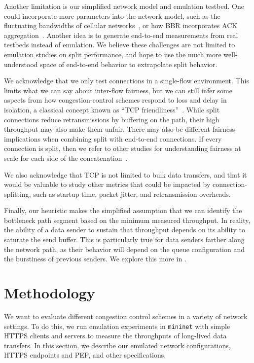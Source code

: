 Another limitation is our simplified network model and emulation testbed.
One could incorporate more parameters into the network model, such as the
fluctuating bandwidths of cellular networks~\cite{hayes2019mmwave}, or how BBR
incorporates ACK aggregation~\cite{cardwell2018bbr-ietf101}. Another idea is to
generate end-to-end measurements from real testbeds instead of emulation. We
believe these challenges are not limited to emulation studies on split
performance, and hope to use the much more well-understood space of end-to-end
behavior to extrapolate split behavior.

We acknowledge that we only test connections in a single-flow environment.
This limits what we can say about inter-flow fairness, but we can still infer
some aspects from how congestion-control schemes respond to loss and delay in
isolation, a classical concept known as ``TCP friendliness''~\cite{rfc5348}.
While split connections reduce retransmissions by buffering on the path,
their high throughput may also make them unfair. There may also be different
fairness implications when combining split with end-to-end connections.
If every connection is split, then we refer to other studies for understanding
fairness at scale for each side of the concatenation~\cite
{philip2021revisiting}.

We also acknowledge that TCP is not limited to bulk data transfers, and that
it would be valuable to study other metrics that could be impacted by
connection-splitting, such as startup time, packet jitter, and retransmission
overheads.

Finally, our heuristic makes the simplified assumption that we can identify the
bottleneck path segment based on the minimum measured throughput. In reality,
the ability of a data sender to sustain that throughput depends on its ability
to saturate the send buffer. This is particularly true for data senders farther
along the network path, as their behavior will depend on the queue
configuration and the burstiness of previous senders. We explore this more
in .

\section{Methodology}
\label{sec:splitting:methodology}




We want to evaluate different congestion control schemes in a variety of network
settings. To do this, we run emulation experiments in \texttt{mininet} with
simple HTTPS clients and servers to measure the throughputs of long-lived data
transfers. In this section,
we describe our emulated network configurations, HTTPS endpoints and
PEP, and other specifications.

